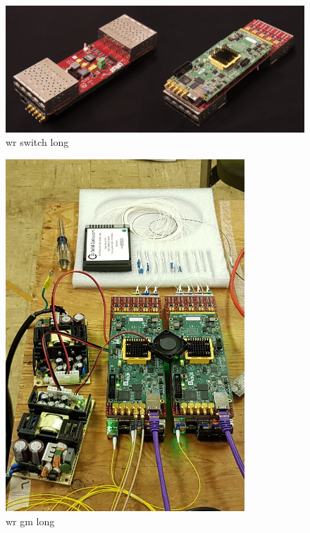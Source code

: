 \begin{figure} %
    \includegraphics[width=\textwidth]{diagrams/5-daq/wr_switch.jpg}
    \caption[wr switch short]
    {wr switch long}
    \label{fig:wr_switch}
\end{figure} %

\begin{figure} %
    \includegraphics[width=0.8\textwidth]{diagrams/5-daq/wr_gm.jpg}
    \caption[wr gm short]
    {wr gm long}
    \label{fig:wr_gm}
\end{figure} %

